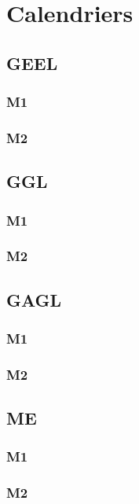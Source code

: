 \documentclass[a4paper,11pt]{article}
\begin{document}
\section{Calendriers}\label{Calendrier}

\subsection{GEEL}

\subsubsection{M1}

\subsubsection{M2}


\subsection{GGL}

\subsubsection{M1}

\subsubsection{M2}


\subsection{GAGL}

\subsubsection{M1}

\subsubsection{M2}


\subsection{ME}

\subsubsection{M1}

\subsubsection{M2}
\end{document}

